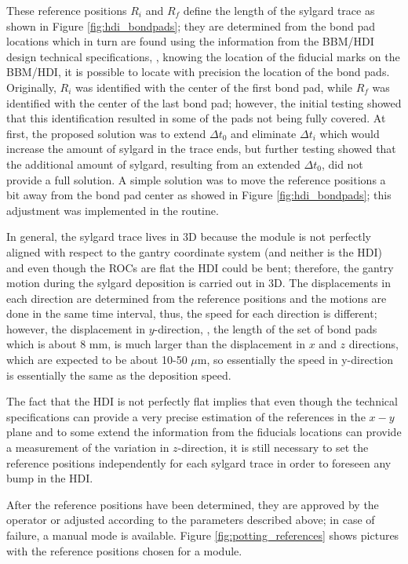 These reference positions $R_i$ and $R_f$ define the length of the sylgard trace as shown in Figure \ref{fig:hdi_bondpads}; they are determined from the bond pad locations which in turn are found using the information from the BBM/HDI design technical specifications, \ie, knowing the location of the fiducial marks on the BBM/HDI, it is possible to locate with precision the location of the bond pads. Originally, $R_i$ was identified with the center of the first bond pad, while $R_f$ was identified with the center of the last bond pad; however, the initial testing showed that this identification resulted in some of the pads not being fully covered. At first, the proposed solution was to extend $\Delta t_0$ and eliminate $\Delta t_i$ which would increase the amount of sylgard in the trace ends, but further testing showed that the additional amount of sylgard, resulting from an extended $\Delta t_0$, did not provide a full solution. A simple solution was to move the reference positions a bit away from the bond pad center as showed in Figure \ref{fig:hdi_bondpads}; this adjustment was implemented in the routine. 

In general, the sylgard trace lives in 3D because the module is not perfectly aligned with respect to the gantry coordinate system (and neither is the HDI) and even though the ROCs are flat the HDI could be bent; therefore, the gantry motion during the sylgard deposition is carried out in 3D. The displacements in each direction are determined from the reference positions and the motions are done in the same time interval, thus, the speed for each direction is different; however, the displacement in $y$-direction, \ie, the length of the set of bond pads which is about 8 mm, is much larger than the displacement in $x$ and $z$ directions, which are expected to be about 10-50 $\mu$m, so essentially the speed in y-direction is essentially the same as the deposition speed.

The fact that the HDI is not perfectly flat implies that even though the technical specifications can provide a very precise estimation of the references in the $x-y$ plane and to some extend the information from the fiducials locations can provide a measurement of the variation in $z$-direction, it is still necessary to set the reference positions independently for each sylgard trace in order to foreseen any bump in the HDI.

After the reference positions have been determined, they are approved by the operator or adjusted according to the parameters described above; in case of failure, a manual mode is available. Figure \ref{fig:potting_references} shows pictures with the reference positions chosen for a module.        

